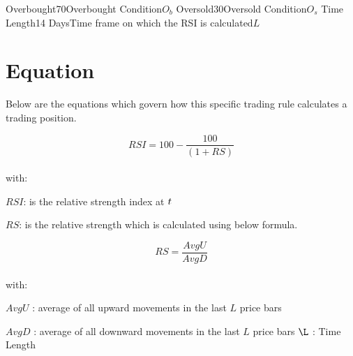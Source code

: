 \documentclass{article}
\begin{document}
\logo
{} %
\tblofcontents

{Overbought}{70}{Overbought Condition}{$O_b$}
{Oversold}{30}{Oversold Condition}{$O_s$}
{Time Length}{14 Days}{Time frame on which the RSI is calculated}{$L$}
\stoptable %


\section{Equation}
Below are the equations which govern how this specific trading rule calculates a trading position.

\begin{equation}
RSI = 100-\frac{100}{(1+RS)}
\end{equation}
\\
with:

$RSI$: is the relative strength index at $t$

$RS$: is the relative strength which is calculated using below formula.

\begin{equation}
RS = \frac{AvgU}{AvgD}
\end{equation}
\\
with:

$AvgU$ : average of all upward movements in the last $L$ price bars

$AvgD$ : average of all downward movements in the last $L$ price bars
$\L$ : Time Length

\keyterms
\furtherlinks 
\end{document}
